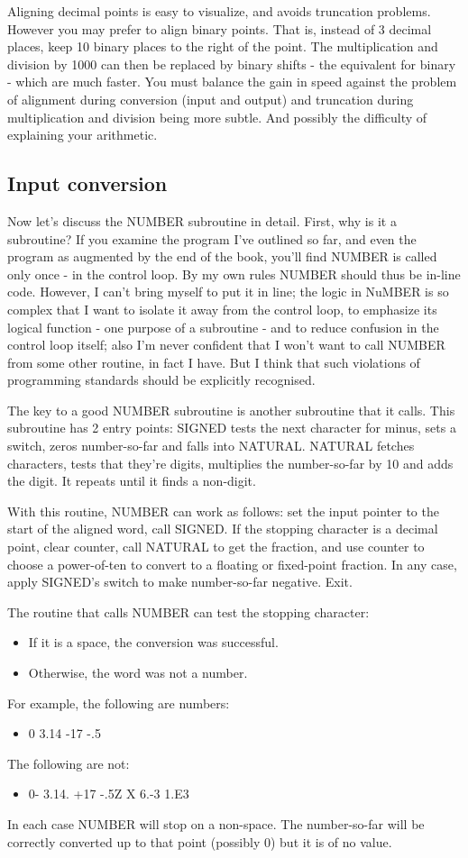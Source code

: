 \documentclass[b5paper, oneside]{book}
\begin{document}
Aligning decimal points is easy to visualize, and avoids truncation problems. However you may prefer to align binary points. That is, instead of 3 decimal places, keep 10 binary places to the right of the point. The multiplication and division by 1000 can then be replaced by binary shifts - the equivalent for binary - which are much faster. You must balance the gain in speed against the problem of alignment during conversion (input and output) and truncation during multiplication and division being more subtle. And possibly the difficulty of explaining your arithmetic.

\subsection{Input conversion}
Now let's discuss the NUMBER subroutine in detail. First, why is it a subroutine? If you examine the program I've outlined so far, and even the program as augmented by the end of the book, you'll find NUMBER is called only once - in the control loop. By my own rules NUMBER should thus be in-line code. However, I can't bring myself to put it in line; the logic in NuMBER is so complex that I want to isolate it away from the control loop, to emphasize its logical function - one purpose of a subroutine - and to reduce confusion in the control loop itself; also I'm never confident that I won't want to call NUMBER from some other routine, in fact I have. But I think that such violations of programming standards should be explicitly recognised.

The key to a good NUMBER subroutine is another subroutine that it calls. This subroutine has 2 entry points: SIGNED tests the next character for minus, sets a switch, zeros number-so-far and falls into NATURAL. NATURAL fetches characters, tests that they're digits, multiplies the number-so-far by 10 and adds the digit. It repeats until it finds a non-digit.

With this routine, NUMBER can work as follows: set the input pointer to the start of the aligned word, call SIGNED. If the stopping character is a decimal point, clear counter, call NATURAL to get the fraction, and use counter to choose a power-of-ten to convert to a floating or fixed-point fraction. In any case, apply SIGNED's switch to make number-so-far negative. Exit.

The routine that calls NUMBER can test the stopping character:\begin{itemize}
   \item If it is a space, the conversion was successful.
   \item Otherwise, the word was not a number.\end{itemize}
For example, the following are numbers:\begin{itemize}
   \item 0 3.14 -17 -.5\end{itemize}
The following are not:\begin{itemize}
   \item 0- 3.14. +17 -.5Z X 6.-3 1.E3\end{itemize}
In each case NUMBER will stop on a non-space. The number-so-far will be correctly converted up to that point (possibly 0) but it is of no value.
\end{document}
